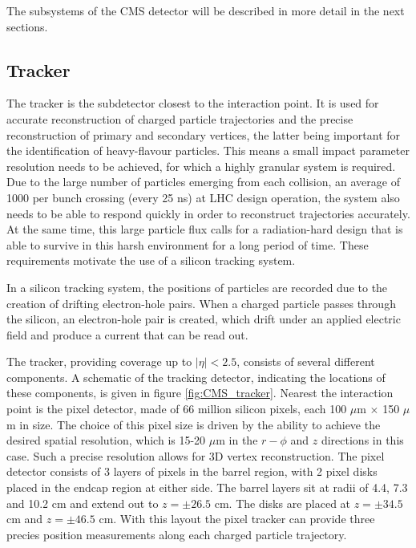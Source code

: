 The subsystems of the \ac{CMS} detector will be described in more detail in the 
next sections.

\subsection{Tracker}
\label{sec:CMSLHC_CMS_tracker}
The tracker \cite{cms-jinst} is the subdetector closest to the interaction point. It
is used for accurate reconstruction of charged particle trajectories and 
the precise reconstruction of primary and secondary vertices, the latter being important for
the identification of heavy-flavour particles. This means a small impact parameter
resolution needs to be achieved, for which a highly granular system is required. 
Due to the large number of particles emerging from 
each collision, an average of 1000 per bunch crossing (every 25 ns) at LHC design operation, the 
system also needs to be able to respond quickly in order to reconstruct trajectories accurately.
At the same time, this large particle flux calls for a 
radiation-hard design that is able to survive in this harsh environment
for a long period of time. These requirements motivate the use of a silicon tracking
system. 

In a silicon tracking system, the positions of particles are recorded
due to the creation of drifting electron-hole pairs.
When a charged particle passes through the silicon, an electron-hole pair
is created, which drift under an applied electric field and produce a current
that can be read out. %

The tracker, providing coverage up to $|\eta|<2.5$, consists of 
several different components. A schematic of the tracking detector, indicating
the locations of these components, is given in figure \ref{fig:CMS_tracker}.
Nearest the interaction point is the pixel detector, made
of 66 million silicon pixels, each 100 $\mu$m $\times$ 150 $\mu$m in size.
The choice of this pixel size is driven by the ability to achieve the desired spatial resolution,
which is 15-20 $\mu$m in the $r-\phi$ and $z$ directions in this case. Such a
precise resolution allows for 3D vertex reconstruction. The pixel
detector consists of 3 layers of pixels in the barrel region, with 2 pixel disks 
placed in the endcap region at either side. The barrel layers sit at radii of
4.4, 7.3 and 10.2 cm and extend out to $z=\pm 26.5$ cm. The disks are placed
at $z=\pm 34.5$ cm and $z=\pm 46.5$ cm. With this layout the pixel tracker can
provide three precies position measurements along each charged particle trajectory.


